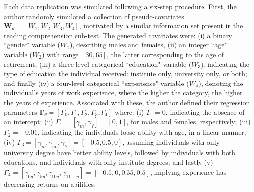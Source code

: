 Each data replication was simulated following a six-step procedure. First, the author randomly simulated a collection of pseudo-covariates $\mathbf{W}_{\theta} = [ W_{1}, W_{2}, W_{3}, W_{4} ]$, motivated by a similar information set present in the reading comprehension sub-test. The generated covariates were: (i) a binary ``gender" variable ($W_{1}$), describing males and females, (ii) an integer ``age" variable ($W_{2}$) with range $[30, 65]$, the latter corresponding to the age of retirement, (iii) a three-level categorical ``education" variable ($W_{3}$), indicating the type of education the individual received: institute only, university only, or both; and finally (iv) a four-level categorical ``experience" variable ($W_{4}$), denoting the individual's years of work experience, where the higher the category, the higher the years of experience. Associated with these, the author defined their regression parameters $\mathbf{\Gamma}_{\theta} = [\Gamma_{0}, \Gamma_{1}, \Gamma_{2}, \Gamma_{3}, \Gamma_{4}]$ where: (i) $\Gamma_{0} = 0$, indicating the absence of an intercept; (ii) $\Gamma_{1} = [\gamma_{m}, \gamma_{f}] = [0, 1]$, for males and females, respectively; (iii) $\Gamma_{2} = -0.01$, indicating the individuals loose ability with age, in a linear manner; (iv) $\Gamma_{3} = [\gamma_{io}, \gamma_{uo}, \gamma_{b}] = [-0.5, 0.5, 0]$, assuming individuals with only university degree have better ability levels, followed by individuals with both educations, and individuals with only institute degrees; and lastly (v) $\Gamma_{4} = [\gamma_{0y}, \gamma_{5y}, \gamma_{10y}, \gamma_{11+y}] = [-0.5, 0, 0.35, 0.5]$, implying experience has decreasing returns on abilities.

